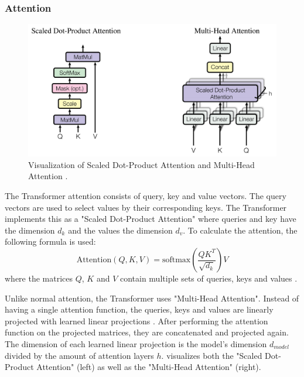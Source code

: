\subsubsection{Attention}

\begin{figure}[h]
\centering
\includegraphics[width=0.7\paperwidth]{figures/scaled-dot-product-multihead-attention}
\caption[Visualization of Scaled Dot-Product Attention and Multi-Head Attention]{Visualization of Scaled Dot-Product Attention and Multi-Head Attention \cite[p.~4]{1706.03762}.}
\label{fig:scaled-dot-product-multihead-attention}
\end{figure}

The Transformer attention consists of query, key and value vectors.
The query vectors are used to select values by their corresponding keys.
The Transformer implements this as a "Scaled Dot-Product Attention" where queries and key have the dimension $d_k$ and the values the dimension $d_v$.
To calculate the attention, the following formula is used:
\[
	\textrm{Attention}(Q,K,V) = \textrm{softmax}(\dfrac{QK^T}{\sqrt{d_k}})V
\]
where the matrices $Q$, $K$ and $V$ contain multiple sets of queries, keys and values \cite[p.~3--4]{1706.03762}.

Unlike normal attention, the Transformer uses "Multi-Head Attention".
Instead of having a single attention function, the queries, keys and values are linearly projected with learned linear projections \cite[p.~4--5]{1706.03762}.
After performing the attention function on the projected matrices, they are concatenated and projected again.
The dimension of each learned linear projection is the model's dimension $d_{model}$ divided by the amount of attention layers $h$.
 visualizes both the "Scaled Dot-Product Attention" (left) as well as the "Multi-Head Attention" (right).

